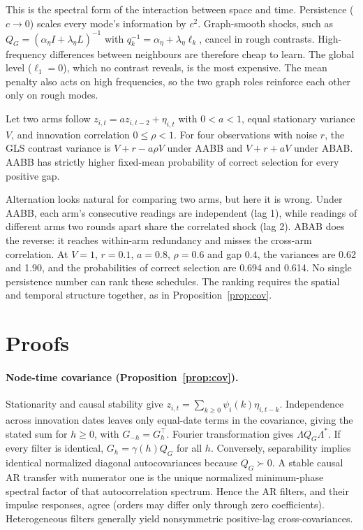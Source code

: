 \documentclass[sigconf,review,anonymous]{acmart}
\begin{document}
This is the spectral form of the interaction between space and time. Persistence ($c\to0$) scales every mode's information by $c^2$. Graph-smooth shocks, such as $Q_G=(\alpha_\eta I+\lambda_\eta L)^{-1}$ with $q_k^{-1}=\alpha_\eta+\lambda_\eta\ell_k$, cancel in rough contrasts. High-frequency differences between neighbours are therefore cheap to learn. The global level ($\ell_1=0$), which no contrast reveals, is the most expensive. The mean penalty also acts on high frequencies, so the two graph roles reinforce each other only on rough modes.

\begin{proposition}\label{prop:ar2}
Let two arms follow $z_{i,t}=az_{i,t-2}+\eta_{i,t}$ with $0<a<1$, equal stationary variance $V$, and innovation correlation $0\le\rho<1$. For four observations with noise $r$, the GLS contrast variance is $V+r-a\rho V$ under AABB and $V+r+aV$ under ABAB. AABB has strictly higher fixed-mean probability of correct selection for every positive gap.
\end{proposition}

Alternation looks natural for comparing two arms, but here it is wrong. Under AABB, each arm's consecutive readings are independent (lag 1), while readings of different arms two rounds apart share the correlated shock (lag 2). ABAB does the reverse: it reaches within-arm redundancy and misses the cross-arm correlation. At $V=1$, $r=0.1$, $a=0.8$, $\rho=0.6$ and gap $0.4$, the variances are 0.62 and 1.90, and the probabilities of correct selection are 0.694 and 0.614. No single persistence number can rank these schedules. The ranking requires the spatial and temporal structure together, as in Proposition~\ref{prop:cov}.

\section{Proofs}\label{app:proofs}

\paragraph{Node-time covariance (Proposition~\ref{prop:cov}).}
Stationarity and causal stability give $z_{i,t}=\sum_{k\ge0}\psi_i(k)\eta_{i,t-k}$. Independence across innovation dates leaves only equal-date terms in the covariance, giving the stated sum for $h\ge0$, with $G_{-h}=G_h^\top$. Fourier transformation gives $\Lambda Q_G\Lambda^*$. If every filter is identical, $G_h=\gamma(h)Q_G$ for all $h$. Conversely, separability implies identical normalized diagonal autocovariances because $Q_G\succ0$. A stable causal AR transfer with numerator one is the unique normalized minimum-phase spectral factor of that autocorrelation spectrum. Hence the AR filters, and their impulse responses, agree (orders may differ only through zero coefficients). Heterogeneous filters generally yield nonsymmetric positive-lag cross-covariances.
\end{document}
